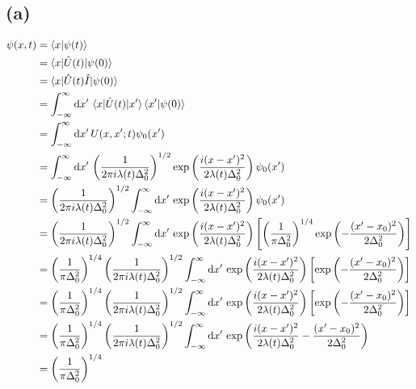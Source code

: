\documentclass[letter, 10pts]{article}
\begin{document}
\subsection*{(a)} 
\begin{align*}
	\psi(x,t) &= \braket{x | \psi(t)}  \\
	&= \braket{x | \hat{U}(t) | \psi(0)} \\
	&= \braket{x | \hat{U}(t) \hat{I} | \psi(0)} \\
	&= \int_{-\infty}^{\infty} \mathrm{d} x' \, 
	\braket{x | \hat{U}(t) | x'} \braket{x' | \psi(0)}\\
	&= \int_{-\infty}^{\infty} \mathrm{d} x' \, 
	U(x,x'; t) \psi_0 (x') \\
	&= \int_{-\infty}^{\infty}   
	\mathrm{d} x' \, 
	\left(\frac{1}{2 \pi i \lambda(t) \Delta_0 ^2}\right) 
	^{1 / 2} 
	\exp
	\left(
\frac{i(x-x')^2}{2 \lambda(t) \Delta_0^2}
	\right)
\psi_0(x')
	\\
	&= 
	\left(\frac{1}{2 \pi i \lambda(t) \Delta_0 ^2}\right) 
	^{1 / 2} 
	\int_{-\infty}^{\infty}   
	\mathrm{d} x' \, 
	\exp
	\left(
\frac{i(x-x')^2}{2 \lambda(t) \Delta_0^2}
	\right)
\psi_0(x')
	\\
	&= 
	\left(\frac{1}{2 \pi i \lambda(t) \Delta_0 ^2}\right) 
	^{1 / 2} 
	\int_{-\infty}^{\infty}   
	\mathrm{d} x' \, 
	\exp
	\left(
\frac{i(x-x')^2}{2 \lambda(t) \Delta_0^2}
	\right)\left[
	\left(\frac{1}{\pi \Delta_0^2}\right)^{1 / 4} 
	\exp\left(
- \frac{(x'-x_0)^2}{2 \Delta_0^2}
\right)\right]
	\\
	&= 
	\left(\frac{1}{\pi \Delta_0^2}\right)^{1 / 4} 
	\left(\frac{1}{2 \pi i \lambda(t) \Delta_0 ^2}\right) 
	^{1 / 2} 
	\int_{-\infty}^{\infty}   
	\mathrm{d} x' \, 
	\exp
	\left(
\frac{i(x-x')^2}{2 \lambda(t) \Delta_0^2}
	\right)\left[
	\exp\left(
- \frac{(x'-x_0)^2}{2 \Delta_0^2}
\right)\right]
	\\
	&= 
	\left(\frac{1}{\pi \Delta_0^2}\right)^{1 / 4} 
	\left(\frac{1}{2 \pi i \lambda(t) \Delta_0 ^2}\right) 
	^{1 / 2} 
	\int_{-\infty}^{\infty}   
	\mathrm{d} x' \, 
	\exp
	\left(
\frac{i(x-x')^2}{2 \lambda(t) \Delta_0^2}
	\right)\left[
	\exp\left(
- \frac{(x'-x_0)^2}{2 \Delta_0^2}
\right)\right]
\\
	&= 
	\left(\frac{1}{\pi \Delta_0^2}\right)^{1 / 4} 
	\left(\frac{1}{2 \pi i \lambda(t) \Delta_0 ^2}\right) 
	^{1 / 2} 
	\int_{-\infty}^{\infty}   
	\mathrm{d} x' \, 
	\exp
	\left(
\frac{i(x-x')^2}{2 \lambda(t) \Delta_0^2}
	-
\frac{(x'-x_0)^2}{2 \Delta_0^2}
\right)
\\
	&= 
	\left(\frac{1}{\pi \Delta_0^2}\right)^{1 / 4} 

\end{align*}
\end{document}
